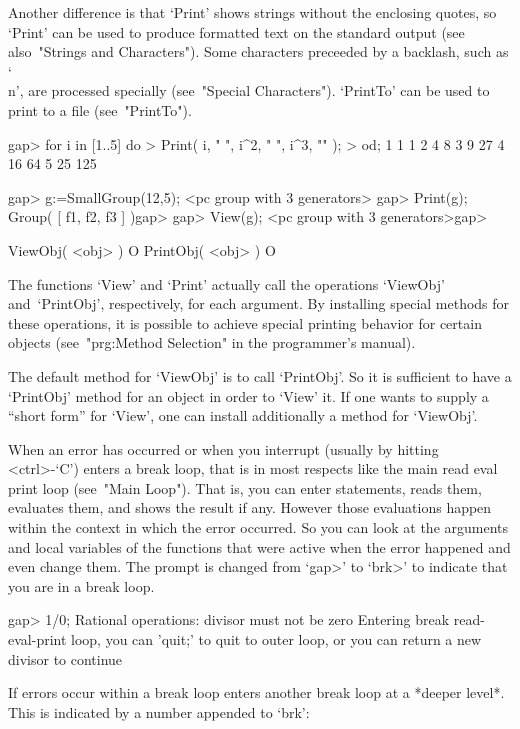 Another difference is that `Print' shows strings without the enclosing
quotes, so `Print' can be used to produce formatted text on the
standard output (see also~"Strings and Characters").
Some characters preceeded by a backlash, such as `\\n', are processed
specially (see~"Special Characters").
`PrintTo' can be used to print to a file (see~"PrintTo").

\begintt
gap> for i in [1..5] do
>      Print( i, " ", i^2, " ", i^3, "\n" );
>    od;
1 1 1
2 4 8
3 9 27
4 16 64
5 25 125 
\endtt

\begintt
gap> g:=SmallGroup(12,5);
<pc group with 3 generators>
gap> Print(g);
Group( [ f1, f2, f3 ] )gap> 
gap> View(g);
<pc group with 3 generators>gap> 
\endtt

\>ViewObj( <obj> ) O
\>PrintObj( <obj> ) O

The functions `View' and `Print' actually call the operations
`ViewObj' and~`PrintObj', respectively, for each argument.
By installing special methods for these operations,
it is possible to achieve special printing behavior for certain objects
(see~"prg:Method Selection" in the programmer's manual).

The default method for `ViewObj' is to call `PrintObj'.
So it is sufficient to have a `PrintObj' method for an object in order
to `View' it.
If one wants to supply a ``short form'' for `View',
one can install additionally a method for `ViewObj'.


When an error has occurred or when you interrupt {\GAP} (usually by
hitting <ctrl>-`C') {\GAP} enters a break loop, that is in most respects
like the main read eval print loop (see~"Main Loop"). That is, you can
enter statements, {\GAP} reads them, evaluates them, and shows the
result if any. However those evaluations happen within the context in
which the error occurred. So you can look at the arguments and local
variables of the functions that were active when the error happened and
even change them. The prompt is changed from `gap>' to `brk>' to
indicate that you are in a break loop.

\begintt
gap> 1/0;
Rational operations: divisor must not be zero
Entering break read-eval-print loop, you can 'quit;' to quit to outer loop,
or you can return a new divisor to continue
\endtt

If errors occur within a break loop {\GAP} enters another break loop at a
*deeper level*. This is indicated by a number appended to `brk':


